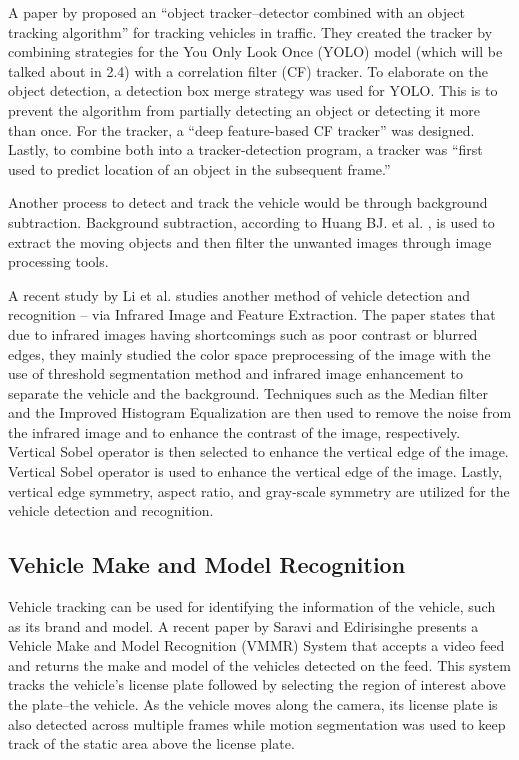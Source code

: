 	A paper by \cite{yang_2020} proposed an “object tracker–detector combined with an object tracking algorithm” for tracking vehicles in traffic. They created the tracker by combining strategies for the You Only Look Once (YOLO) model (which will be talked about in 2.4) with a correlation filter (CF) tracker. To elaborate on the object detection, a detection box merge strategy was used for YOLO. This is to prevent the algorithm from partially detecting an object or detecting it more than once. For the tracker, a “deep feature-based CF tracker” was designed. Lastly, to combine both into a tracker-detection program, a tracker was “first used to predict location of an object in the subsequent frame.”

	Another process to detect and track the vehicle would be through background subtraction. Background subtraction, according to Huang BJ. et al. \citeyear{Huang_2017}, is used to extract the moving objects and then filter the unwanted images through image processing tools. 
	
	A recent study by Li et al. \citeyear{li_2022} studies another method of vehicle detection and recognition – via Infrared Image and Feature Extraction. The paper states that due to infrared images having shortcomings such as poor contrast or blurred edges, they mainly studied the color space preprocessing of the image with the use of threshold segmentation method and infrared image enhancement to separate the vehicle and the background. Techniques such as the Median filter and the Improved Histogram Equalization are then used to remove the noise from the infrared image and to enhance the contrast of the image, respectively. Vertical Sobel operator is then selected to enhance the vertical edge of the image. Vertical Sobel operator is used to enhance the vertical edge of the image. Lastly, vertical edge symmetry, aspect ratio, and gray-scale symmetry are utilized for the vehicle detection and recognition.


\subsection { Vehicle Make and Model Recognition}

	Vehicle tracking can be used for identifying the information of the vehicle, such as its brand and model. A recent paper by Saravi and Edirisinghe \citeyear{Saravi2017} presents a Vehicle Make and Model Recognition (VMMR) System that accepts a video feed and returns the make and model of the vehicles detected on the feed. This system tracks the vehicle’s license plate followed by selecting the region of interest above the plate–the vehicle. As the vehicle moves along the camera, its license plate is also detected across multiple frames while motion segmentation was used to keep track of the static area above the license plate.

